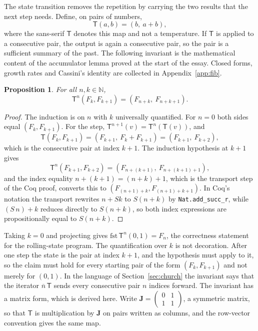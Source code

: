 \documentclass[11pt]{article}
\newtheorem{proposition}{Proposition}
\theoremstyle{definition}
\theoremstyle{remark}
\newcommand{\cn}[1]{\overline{#1}}
\newcommand{\Tm}{\mathsf{T}}
\begin{document}
The state transition removes the repetition by carrying the two results that the next step needs. Define, on pairs of numbers,
\[
\Tm(a,b) = (b,\ a+b),
\]
where the sans-serif $\Tm$ denotes this map and not a temperature. If $\Tm$ is applied to a consecutive pair, the output is again a consecutive pair, so the pair is a sufficient summary of the past. The following invariant is the mathematical content of the accumulator lemma proved at the start of the essay. Closed forms, growth rates and Cassini's identity are collected in Appendix~\ref{app:fib}.

\begin{proposition}\label{prop:invariant}
For all $n, k \in \mathbb{N}$,
\[
\Tm^{n}(F_k, F_{k+1}) = (F_{n+k},\ F_{n+k+1}) .
\]
\end{proposition}

\begin{proof}
The induction is on $n$ with $k$ universally quantified. For $n = 0$ both sides equal $(F_k, F_{k+1})$. For the step, $\Tm^{n+1}(v) = \Tm^{n}(\Tm(v))$, and
\[
\Tm(F_k, F_{k+1}) = (F_{k+1},\ F_k + F_{k+1}) = (F_{k+1},\ F_{k+2}),
\]
which is the consecutive pair at index $k+1$. The induction hypothesis at $k+1$ gives
\[
\Tm^{n}(F_{k+1}, F_{k+2}) = (F_{n+(k+1)},\ F_{n+(k+1)+1}),
\]
and the index equality $n + (k+1) = (n+k) + 1$, which is the transport step of the Coq proof, converts this to $(F_{(n+1)+k}, F_{(n+1)+k+1})$. In Coq's notation the transport rewrites $n + S k$ to $S(n+k)$ by \texttt{Nat.add\_succ\_r}, while $(S\,n) + k$ reduces directly to $S(n+k)$, so both index expressions are propositionally equal to $S(n+k)$.
\end{proof}

Taking $k = 0$ and projecting gives $\mathrm{fst}\,\Tm^{n}(0,1) = F_n$, the correctness statement for the rolling-state program. The quantification over $k$ is not decoration. After one step the state is the pair at index $k+1$, and the hypothesis must apply to it, so the claim must hold for every starting pair of the form $(F_k, F_{k+1})$ and not merely for $(0,1)$. In the language of Section~\ref{sec:church} the invariant says that the iterator $\cn{n}\,\Tm$ sends every consecutive pair $n$ indices forward. The invariant has a matrix form, which is derived here. Write $\mathbf{J} = \begin{pmatrix}0&1\\1&1\end{pmatrix}$, a symmetric matrix, so that $\Tm$ is multiplication by $\mathbf{J}$ on pairs written as columns, and the row-vector convention gives the same map.
\end{document}
